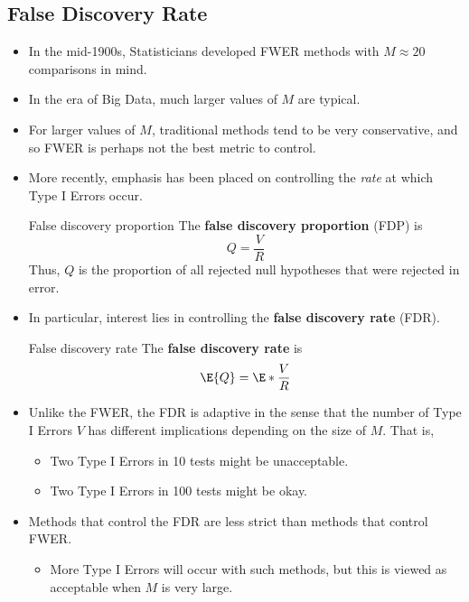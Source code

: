 \subsection{False Discovery Rate}
\begin{itemize}
      \item In the mid-1900s, Statisticians developed FWER methods with $ M\approx 20 $ comparisons in mind.
      \item In the era of Big Data, much larger values of $M$ are typical.
      \item For larger values of $M$, traditional methods tend to be very conservative, and so FWER is perhaps
            not the best metric to control.
      \item More recently, emphasis has been placed on controlling the \emph{rate} at which Type I Errors occur.
            \begin{Definition}{False discovery proportion}{}
                  The \textbf{false discovery proportion} (FDP) is
                  \[ Q=\frac{V}{R} \]
                  Thus, $ Q $ is the proportion of all rejected null hypotheses that were rejected
                  in error.
            \end{Definition}
      \item In particular, interest lies in controlling the \textbf{false discovery rate} (FDR).
            \begin{Definition}{False discovery rate}{}
                  The \textbf{false discovery rate} is
                  \[ \E{Q}=\E*{\frac{V}{R}} \]
            \end{Definition}
      \item Unlike the FWER, the FDR is adaptive in the sense that the number of Type I Errors $V$ has different
            implications depending on the size of $M$. That is,
            \begin{itemize}
                  \item Two Type I Errors in 10 tests might be unacceptable.
                  \item Two Type I Errors in 100 tests might be okay.
            \end{itemize}
      \item Methods that control the FDR are less strict than methods that control FWER\@.
            \begin{itemize}
                  \item More Type I Errors will occur with such methods, but this is viewed as acceptable when $M$ is
                        very large.
            \end{itemize}
\end{itemize}
